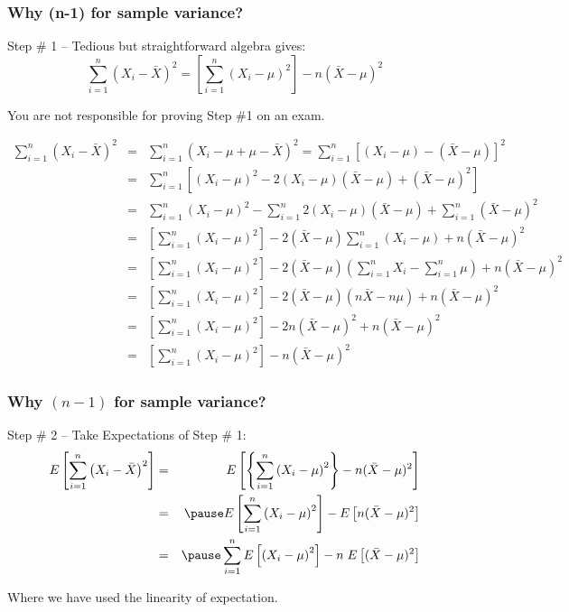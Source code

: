 \documentclass[handout]{beamer}
\begin{document}
\begin{frame}
\frametitle{Why (n-1) for sample variance?}
\begin{block}{Step \# 1 -- Tedious but straightforward algebra gives:}
	$$\sum_{i=1}^n \left(X_i - \bar{X}\right)^2 = \left[  \sum_{i=1}^n \left(X_i - \mu\right)^2\right] - n(\bar{X}-\mu)^2$$
\end{block}
\alert{You are not responsible for proving Step \#1 on an exam.}

\end{frame}
\begin{frame}
\scriptsize
\begin{eqnarray*}
	\sum_{i=1}^n \left(X_i - \bar{X}\right)^2 &=& \sum_{i=1}^n \left(X_i - \mu + \mu - \bar{X}\right)^2 = \sum_{i=1}^n \left[(X_i -\mu) - (\bar{X} - \mu)\right]^2\\
		&=&\sum_{i=1}^n \left[(X_i -\mu)^2 - 2(X_i -\mu)(\bar{X} - \mu) + (\bar{X} - \mu)^2\right]\\
		&=&\sum_{i=1}^n (X_i -\mu)^2 - \sum_{i=1}^n 2(X_i -\mu)(\bar{X} - \mu) + \sum_{i=1}^n (\bar{X} - \mu)^2\\
		&=& \left[  \sum_{i=1}^n \left(X_i - \mu\right)^2\right]   - 2(\bar{X} - \mu) \sum_{i=1}^n (X_i -\mu)+n(\bar{X} - \mu)^2\\
				&=& \left[  \sum_{i=1}^n \left(X_i - \mu\right)^2\right]   - 2(\bar{X} - \mu) \left( \sum_{i=1}^n X_i- \sum_{i=1}^n \mu \right)+n(\bar{X} - \mu)^2\\
				&=& \left[  \sum_{i=1}^n \left(X_i - \mu\right)^2\right]   - 2(\bar{X} - \mu)(n\bar{X}-n\mu)+n(\bar{X} - \mu)^2\\
				&=&\left[  \sum_{i=1}^n \left(X_i - \mu\right)^2\right]   - 2n(\bar{X} - \mu)^2+n(\bar{X} - \mu)^2\\
				&=&\left[  \sum_{i=1}^n \left(X_i - \mu\right)^2\right]   - n(\bar{X} - \mu)^2
\end{eqnarray*}
\end{frame}


\begin{frame}
\frametitle{Why $(n-1)$ for sample variance?}
\begin{block}{Step \# 2 -- Take Expectations of Step \# 1:}
	\begin{eqnarray*}
		E\left[\sum_{i=1}^n \left(X_i - \bar{X}\right)^2\right] &=& E\left[\left\{  \sum_{i=1}^n \left(X_i - \mu\right)^2\right\} - n(\bar{X}-\mu)^2\right]\\
			&=&\pause E\left[ \sum_{i=1}^n \left(X_i - \mu\right)^2\right] -E\left[ n(\bar{X}-\mu)^2\right]\\
			&=&\pause  \sum_{i=1}^n E\left[\left(X_i - \mu\right)^2\right] -n\;E\left[ (\bar{X}-\mu)^2\right]\\
	\end{eqnarray*}
\end{block}
\alert{Where we have used the linearity of expectation.}
\end{frame}
\end{document}
